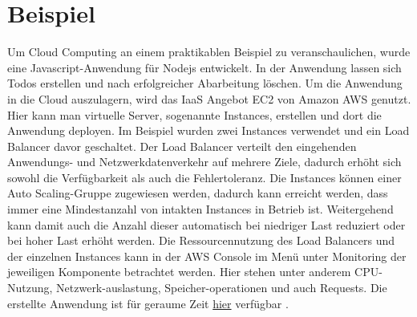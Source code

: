 \section{Beispiel}

Um Cloud Computing an einem praktikablen Beispiel zu veranschaulichen, wurde eine Javascript-Anwendung für Nodejs entwickelt. In der Anwendung lassen sich Todos erstellen und nach erfolgreicher Abarbeitung löschen. Um die Anwendung in die Cloud auszulagern, wird das IaaS Angebot EC2 von Amazon AWS genutzt. Hier kann man virtuelle Server, sogenannte \glqq Instances\grqq{}, erstellen und dort die Anwendung deployen. Im Beispiel wurden zwei \glqq Instances\grqq{} verwendet und ein Load Balancer davor geschaltet. Der Load Balancer verteilt den eingehenden Anwendungs- und Netzwerkdatenverkehr auf mehrere Ziele, dadurch erhöht sich sowohl die Verfügbarkeit als auch die Fehlertoleranz. Die \glqq Instances\grqq{} können einer Auto Scaling-Gruppe zugewiesen werden, dadurch kann erreicht werden, dass immer eine Mindestanzahl von intakten \glqq Instances\grqq{} in Betrieb ist. Weitergehend kann damit auch die Anzahl dieser automatisch bei niedriger Last reduziert oder bei hoher Last erhöht werden. Die Ressourcennutzung des Load Balancers und der einzelnen \glqq Instances\grqq{} kann in der \glqq AWS Console\grqq{} im Menü unter Monitoring der jeweiligen Komponente betrachtet werden. Hier stehen unter anderem CPU-Nutzung, Netzwerk-auslastung, Speicher-operationen und auch Requests. Die erstellte Anwendung ist für geraume Zeit  \href{http://test-lb-1608271566.us-east-1.elb.amazonaws.com:8080/}{hier} verfügbar \cite{aws}. 